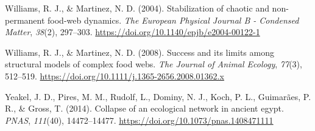 \documentclass[
]{article}
\newlength{\cslhangindent}
\newenvironment{CSLReferences}[2] %
 {\begin{list}{}{%
  \setlength{\itemindent}{0pt}
  \setlength{\leftmargin}{0pt}
  \setlength{\parsep}{0pt}
  \ifodd #1
   \setlength{\leftmargin}{\cslhangindent}
   \setlength{\itemindent}{-1\cslhangindent}
  \fi
  \setlength{\itemsep}{#2\baselineskip}}}
 {\end{list}}
\begin{document}
\begin{CSLReferences}{1}{0}
Williams, R. J., \& Martinez, N. D. (2004). Stabilization of chaotic and
non-permanent food-web dynamics. \emph{The European Physical Journal B -
Condensed Matter}, \emph{38}(2), 297--303.
\url{https://doi.org/10.1140/epjb/e2004-00122-1}

Williams, R. J., \& Martinez, N. D. (2008). Success and its limits among
structural models of complex food webs. \emph{The Journal of Animal
Ecology}, \emph{77}(3), 512--519.
\url{https://doi.org/10.1111/j.1365-2656.2008.01362.x}

Yeakel, J. D., Pires, M. M., Rudolf, L., Dominy, N. J., Koch, P. L.,
Guimarães, P. R., \& Gross, T. (2014). Collapse of an ecological network
in ancient egypt. \emph{PNAS}, \emph{111}(40), 14472--14477.
\url{https://doi.org/10.1073/pnas.1408471111}

\end{CSLReferences}
\end{document}
